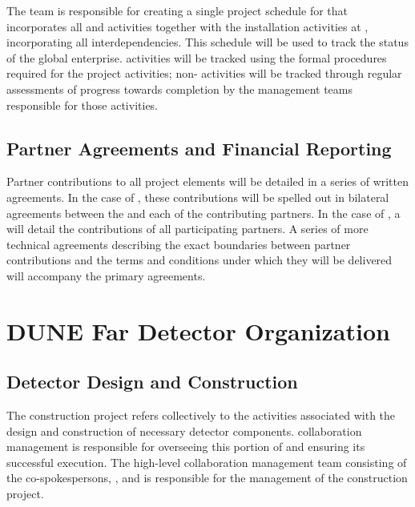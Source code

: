 The  team is responsible for creating a single project
schedule for  that incorporates all  and
 activities together with the installation activities at
, incorporating all interdependencies.  This schedule
will be used to track the status of the global enterprise.   %
 activities will be 
tracked using the formal  procedures required for the 
 project activities; non- activities will be tracked through regular assessments 
of progress towards completion by the management teams responsible 
for those activities. 



\subsection{Partner Agreements and Financial Reporting}   %
\label{sec:dune_agreements}

Partner contributions to all project elements will be detailed 
in a series of written agreements.  In the case of , 
these contributions will be spelled out in bilateral agreements 
between the  and each of the contributing partners.  In 
the case of ,  a  will 
detail the contributions of all participating partners.  
A series of more technical agreements describing the exact 
boundaries between partner contributions and the terms and 
conditions under which they will be delivered will %
accompany the primary agreements.  


\section{DUNE Far Detector Organization}   %
\subsection{Detector Design and Construction}   %
\label{sec:es-tc-det-const}

The   construction project refers collectively 
to the activities associated with the design and construction of 
necessary detector components.   collaboration management 
is responsible for overseeing this portion of   and 
ensuring its successful execution.  The high-level  
collaboration management team consisting of the co-spokespersons, 
, and  is responsible for the
management of the construction project.  


